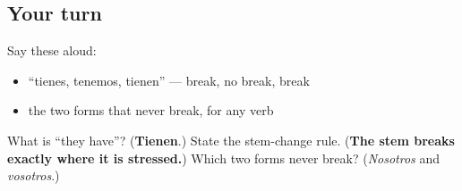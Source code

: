 \subsection*{Your turn}
Say these aloud:

\begin{itemize}
\raggedright
  \item \textquotedblleft{}tienes, tenemos, tienen\textquotedblright{} — break, no break, break
  \item the two forms that never break, for any verb
\end{itemize}

\begin{tcolorbox}[breakable,colback=teal!4,colframe=teal!35!black,title={Before you move on}]
What is \textquotedblleft{}they have\textquotedblright{}? (\textbf{Tienen}.) State the stem-change rule. (\textbf{The stem breaks exactly where it is stressed.}) Which two forms never break? (\emph{Nosotros} and \emph{vosotros}.)
\end{tcolorbox}
